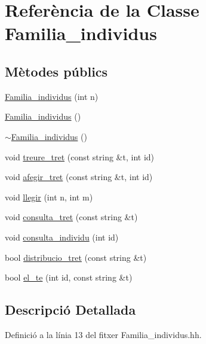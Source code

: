 \hypertarget{class_familia__individus}{}\section{Referència de la Classe Familia\+\_\+individus}
\label{class_familia__individus}
\subsection*{Mètodes públics}
\begin{DoxyCompactItemize}
\item 
\hyperlink{class_familia__individus_aed6c261d1d903986ba012a6e77068f16}{Familia\+\_\+individus} (int n)
\item 
\hyperlink{class_familia__individus_a4fdc0335bc862fe536c88ce14363ece9}{Familia\+\_\+individus} ()
\item 
\hyperlink{class_familia__individus_ac5fa11b87c6720bdaf0df39dd6a11a93}{$\sim$\+Familia\+\_\+individus} ()
\item 
void \hyperlink{class_familia__individus_a1567525d6a6b5cc28060bfb1340627e6}{treure\+\_\+tret} (const string \&t, int id)
\item 
void \hyperlink{class_familia__individus_a72813b3f5351d1eb7c3201e5f1216d13}{afegir\+\_\+tret} (const string \&t, int id)
\item 
void \hyperlink{class_familia__individus_ac83d9f2fefeb5a1f10e2e1210589aa87}{llegir} (int n, int m)
\item 
void \hyperlink{class_familia__individus_a5051cc10c10fa8283af815f2fa6a3542}{consulta\+\_\+tret} (const string \&t)
\item 
void \hyperlink{class_familia__individus_ab0f7079222f70b2bcbb1e6878f2c8046}{consulta\+\_\+individu} (int id)
\item 
bool \hyperlink{class_familia__individus_ad0182a42b2049b87ba8de80f157002b8}{distribucio\+\_\+tret} (const string \&t)
\item 
bool \hyperlink{class_familia__individus_a689854f78335362883d6d4a25c332522}{el\+\_\+te} (int id, const string \&t)
\end{DoxyCompactItemize}


\subsection{Descripció Detallada}


Definició a la línia 13 del fitxer Familia\+\_\+individus.\+hh.



